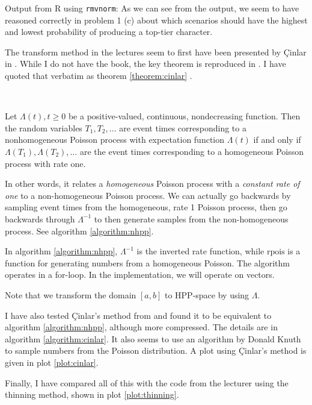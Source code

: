 \documentclass[a4paper,english,12pt]{article}
\begin{document}
Output from R using \texttt{rmvnorm}:
As we can see from the output, we seem to have reasoned correctly in problem 1
(c) about which scenarios should have the highest and lowest probability of
producing a top-tier character.

\clearpage
{}
The transform method in the lectures seem to first have been presented by
Çinlar in \cite[p.~96]{cinlar}. While I do not have the book, the key theorem 
is reproduced in \cite{generating}. I have quoted that verbatim as
theorem \ref{theorem:cinlar} .

~\begin{theorem}
  \label{theorem:cinlar}
  Let $\Lambda(t), t \geqslant 0$ be a positive-valued, continuous,
  nondecreasing function. Then the random variables $T_1, T_2, \dots$ are event
  times corresponding to a nonhomogeneous Poisson process with expectation
  function $\Lambda(t)$ if and only if $\Lambda(T_1), \Lambda(T_2), \dots$ are
  the event times corresponding to a homogeneous Poisson process with rate one.
\end{theorem}

In other words, it relates a \textit{homogeneous} Poisson process with a
\textit{constant rate of one} to a non-homogeneous Poisson process. We can
actually go backwards by sampling event times from the homogeneous, rate 1
Poisson process, then go backwards through $\Lambda^{-1}$ to then generate
samples from the non-homogeneous process. See algorithm \vref{algorithm:nhpp}.

In algorithm \vref{algorithm:nhpp}, $\Lambda^{-1}$ is the inverted rate
function, while $\textrm{rpois}$ is a function for generating numbers from a
homogeneous Poisson. The algorithm operates in a for-loop. In the
implementation, we will operate on vectors.

Note that we transform the domain $[a,b]$ to HPP-space by using $\Lambda$.

I have also tested Çinlar's method from \cite{generating}
and found it to be equivalent to algorithm
\ref{algorithm:nhpp}, although more compressed. The details are in algorithm
\vref{algorithm:cinlar}. It also seems to use an algorithm by Donald Knuth
\cite{knuth} to sample numbers from the Poisson distribution. A plot using
Çinlar's method is given in plot \vref{plot:cinlar}.

Finally, I have compared all of this with the code from the lecturer using the
thinning method, shown in plot \vref{plot:thinning}.
\end{document}
